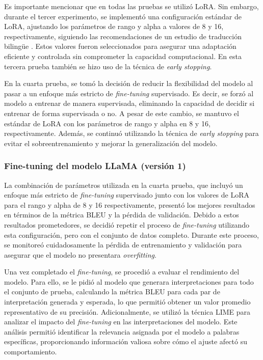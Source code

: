 Es importante mencionar que en todas las pruebas se utilizó LoRA. Sin embargo, durante el tercer experimento, se implementó una configuración estándar de LoRA, ajustando los parámetros de rango y alpha a valores de 8 y 16, respectivamente, siguiendo las recomendaciones de un estudio de traducción bilingüe \cite{weller2022pretrained}. Estos valores fueron seleccionados para asegurar una adaptación eficiente y controlada sin comprometer la capacidad computacional. En esta tercera prueba también se hizo uso de la técnica de \textit{early stopping}.

En la cuarta prueba, se tomó la decisión de reducir la flexibilidad del modelo al pasar a un enfoque más estricto de \textit{fine-tuning} supervisado. Es decir, se forzó al modelo a entrenar de manera supervisada, eliminando la capacidad de decidir si entrenar de forma supervisada o no. A pesar de este cambio, se mantuvo el estándar de LoRA con los parámetros de rango y alpha en 8 y 16, respectivamente. Además, se continuó utilizando la técnica de \textit{early stopping} para evitar el sobreentrenamiento y mejorar la generalización del modelo.


\subsubsection{Fine-tuning del modelo LLaMA (versión 1)}

La combinación de parámetros utilizada en la cuarta prueba, que incluyó un enfoque más estricto de \textit{fine-tuning} supervisado junto con los valores de LoRA para el rango y alpha de 8 y 16 respectivamente, presentó los mejores resultados en términos de la métrica BLEU y la pérdida de validación. Debido a estos resultados prometedores, se decidió repetir el proceso de \textit{fine-tuning} utilizando esta configuración, pero con el conjunto de datos completo. Durante este proceso, se monitoreó cuidadosamente la pérdida de entrenamiento y validación para asegurar que el modelo no presentara \textit{overfitting}. 

Una vez completado el \textit{fine-tuning}, se procedió a evaluar el rendimiento del modelo. Para ello, se le pidió al modelo que generara interpretaciones para todo el conjunto de prueba, calculando la métrica BLEU para cada par de interpretación generada y esperada, lo que permitió obtener un valor promedio representativo de su precisión. Adicionalmente, se utilizó la técnica LIME para analizar el impacto del \textit{fine-tuning} en las interpretaciones del modelo. Este análisis permitió identificar la relevancia asignada por el modelo a palabras específicas, proporcionando información valiosa sobre cómo el ajuste afectó su comportamiento. 

